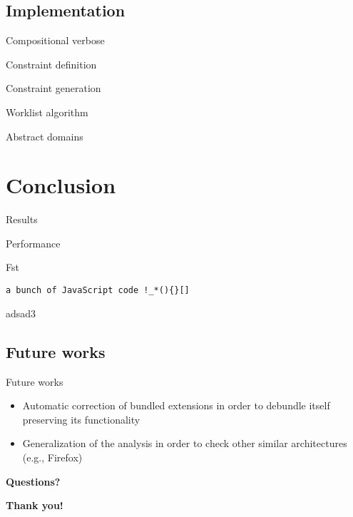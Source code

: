 \documentclass[11pt]{beamer}
\begin{document}
\subsection{Implementation}

\begin{frame}{Compositional verbose}

\end{frame}

\begin{frame}{Constraint definition}

\end{frame}

\begin{frame}{Constraint generation}

\end{frame}

\begin{frame}{Worklist algorithm}

\end{frame}

\begin{frame}{Abstract domains}

\end{frame}

\section{Conclusion}
\begin{frame}{Results}

\end{frame}

\begin{frame}{Performance}

\end{frame}


\begin{frame}[fragile]{Fst}
\begin{lstlisting}
a bunch of JavaScript code !_*(){}[]
\end{lstlisting}
adsad3
\end{frame}

\subsection{Future works}
\begin{frame}{Future works}
\begin{itemize}
\item Automatic correction of bundled extensions in order to debundle itself preserving its functionality
\item Generalization of the analysis in order to check other similar architectures (e.g., Firefox)
\end{itemize}
\end{frame}

\begin{frame}
\begin{center}
{\Large \textbf{Questions?}}
\end{center}
\end{frame}

\begin{frame}
\begin{center}
{\Large \textbf{Thank you!}}
\end{center}
\end{frame}
\end{document}
